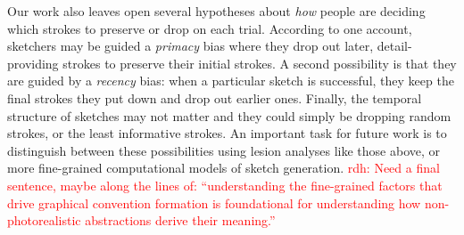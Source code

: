 \documentclass[10pt,letterpaper]{article}
\newcommand{\rdh}[1]{\textcolor{Red}{rdh: #1}}
\begin{document}
Our work also leaves open several hypotheses about \emph{how} people are deciding which strokes to preserve or drop on each trial. 
According to one account, sketchers may be guided a \emph{primacy} bias where they drop out later, detail-providing strokes to preserve their initial strokes.
A second possibility is that they are guided by a \emph{recency} bias: when a particular sketch is successful, they keep the final strokes they put down and drop out earlier ones.
Finally, the temporal structure of sketches may not matter and they could simply be dropping random strokes, or the least informative strokes. 
An important task for future work is to distinguish between these possibilities using lesion analyses like those above, or more fine-grained computational models of sketch generation.
\rdh{Need a final sentence, maybe along the lines of: ``understanding the fine-grained factors that drive graphical convention formation is foundational for understanding how non-photorealistic abstractions derive their meaning.''}



\setlength{\bibleftmargin}{.125in}
\setlength{\bibindent}{-\bibleftmargin}


\end{document}
